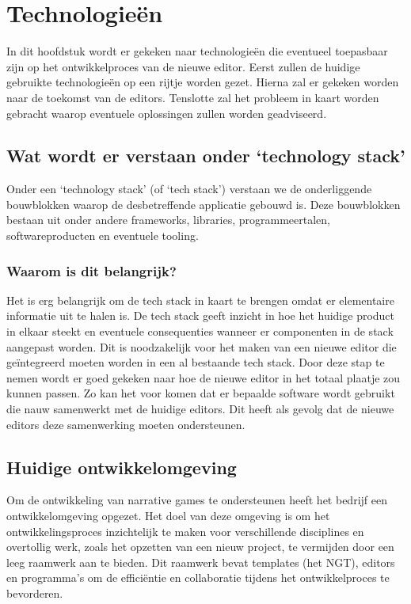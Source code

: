 \chapter{Technologieën}
\label{ch:technologystack}
In dit hoofdstuk wordt er gekeken naar technologieën die eventueel toepasbaar zijn op het ontwikkelproces van de nieuwe editor. Eerst zullen de huidige gebruikte technologieën op een rijtje worden gezet. Hierna zal er gekeken worden naar de toekomst van de editors. Tenslotte zal het probleem in kaart worden gebracht waarop eventuele oplossingen zullen worden geadviseerd.

\section{Wat wordt er verstaan onder ‘technology stack’}
Onder een ‘technology stack’ (of ‘tech stack’) verstaan we de onderliggende bouwblokken waarop de desbetreffende applicatie gebouwd is. Deze bouwblokken bestaan uit onder andere frameworks, libraries, programmeertalen, softwareproducten en eventuele tooling\cite{BlogTechStack}.

\subsection{Waarom is dit belangrijk?}
Het is erg belangrijk om de tech stack in kaart te brengen omdat er elementaire informatie uit te halen is. De tech stack geeft inzicht in hoe het huidige product in elkaar steekt en eventuele consequenties wanneer er componenten in de stack aangepast worden. Dit is noodzakelijk voor het maken van een nieuwe editor die geïntegreerd moeten worden in een al bestaande tech stack. Door deze stap te nemen wordt er goed gekeken naar hoe de nieuwe editor in het totaal plaatje zou kunnen passen. Zo kan het voor komen dat er bepaalde software wordt gebruikt die nauw samenwerkt met de huidige editors. Dit heeft als gevolg dat de nieuwe editors deze samenwerking moeten ondersteunen.

\section{Huidige ontwikkelomgeving}
Om de ontwikkeling van narrative games te ondersteunen heeft het bedrijf een ontwikkelomgeving opgezet. Het doel van deze omgeving is om het ontwikkelingsproces inzichtelijk te maken voor verschillende disciplines en overtollig werk, zoals het opzetten van een nieuw project, te vermijden door een leeg raamwerk aan te bieden. Dit raamwerk bevat templates (het NGT), editors en programma’s om de efficiëntie en collaboratie tijdens het ontwikkelproces te bevorderen.

